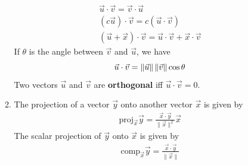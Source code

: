 \documentclass[10pt]{article}
\begin{document}
\begin{multicols*}{2}
\begin{enumerate}
\begin{enumerate}
\begin{align*}
        \vec{u} \cdot \vec{v} = \vec{v} \cdot \vec{u} \\
        (c\vec{u}) \cdot \vec{v} = c(\vec{u} \cdot \vec{v}) \\
        (\vec{u} + \vec{x}) \cdot \vec{v} = \vec{u} \cdot \vec{v} + \vec{x} \cdot \vec{v}
    \end{align*}
    If $\theta$ is the angle between $\vec{v}$ and $\vec{u}$, we have
    \begin{equation*}
        \vec{u} \cdot \vec{v} = \| \vec{u} \| \hspace{.5mm} \| \vec{v} \| \cos{\theta}
    \end{equation*}
    Two vectors $\vec{u}$ and $\vec{v}$ are \textbf{orthogonal} iff $\vec{u} \cdot \vec{v} = 0$.
    \item The projection of a vector $\vec{y}$ onto another vector $\vec{x}$ is given by
    \begin{align*}
        \text{proj}_{\vec{x}} \vec{y} = \frac{\vec{x} \cdot \vec{y}}{\| \vec{x} \|^2}\vec{x}
    \end{align*}
    The scalar projection of $\vec{y}$ onto $\vec{x}$ is given by
    \begin{align*}
        \text{comp}_{\vec{x}} \vec{y} = \frac{\vec{x} \cdot \vec{y}}{\| \vec{x} \|}
    \end{align*}
    

\end{enumerate}
\end{enumerate}
\end{multicols*}
\end{document}
